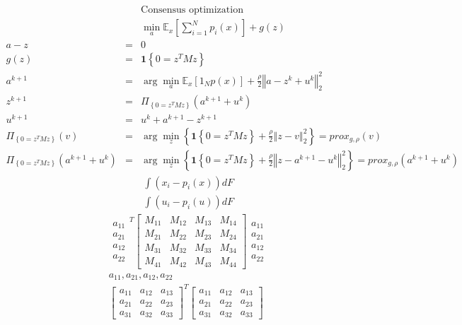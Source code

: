 \documentclass{article}
\begin{document}
\begin{eqnarray*}
&&\text{Consensus optimization} \\
&&\min_{a}\mathbb{E}_{x}\left[ \sum_{i=1}^{N}p_{i}\left( x\right) \right]
+g\left( z\right)  \\
a-z &=&0 \\
g\left( z\right)  &=&\mathbf{1}\left\{ 0=z^{T}Mz\right\}  \\
a^{k+1} &=&\arg \min_{a}\mathbb{E}_{x}\left[ 1_{N}p\left( x\right) \right] +%
\frac{\rho }{2}\left\Vert a-z^{k}+u^{k}\right\Vert _{2}^{2} \\
z^{k+1} &=&\Pi _{\left\{ 0=z^{T}Mz\right\} }\left( a^{k+1}+u^{k}\right)  \\
u^{k+1} &=&u^{k}+a^{k+1}-z^{k+1} \\
\Pi _{\left\{ 0=z^{T}Mz\right\} }\left( v\right)  &=&\arg \min_{z}\left\{ 
\mathbf{1}\left\{ 0=z^{T}Mz\right\} +\frac{\rho }{2}\left\Vert
z-v\right\Vert _{2}^{2}\right\} =prox_{g,\rho }\left( v\right)  \\
\Pi _{\left\{ 0=z^{T}Mz\right\} }\left( a^{k+1}+u^{k}\right)  &=&\arg
\min_{z}\left\{ \mathbf{1}\left\{ 0=z^{T}Mz\right\} +\frac{\rho }{2}%
\left\Vert z-a^{k+1}-u^{k}\right\Vert _{2}^{2}\right\} =prox_{g,\rho }\left(
a^{k+1}+u^{k}\right) 
\end{eqnarray*}%
\begin{eqnarray*}
&&\int \left( x_{i}-p_{i}\left( x\right) \right) dF \\
&&\int \left( u_{i}-p_{i}\left( u\right) \right) dF
\end{eqnarray*}%
\begin{eqnarray*}
&&%
\begin{array}{c}
a_{11} \\ 
a_{21} \\ 
a_{12} \\ 
a_{22}%
\end{array}%
^{T}\left[ 
\begin{array}{cccc}
M_{11} & M_{12} & M_{13} & M_{14} \\ 
M_{21} & M_{22} & M_{23} & M_{24} \\ 
M_{31} & M_{32} & M_{33} & M_{34} \\ 
M_{41} & M_{42} & M_{43} & M_{44}%
\end{array}%
\right] 
\begin{array}{c}
a_{11} \\ 
a_{21} \\ 
a_{12} \\ 
a_{22}%
\end{array}
\\
&&a_{11},a_{21},a_{12},a_{22} \\
&&\left[ 
\begin{array}{ccc}
a_{11} & a_{12} & a_{13} \\ 
a_{21} & a_{22} & a_{23} \\ 
a_{31} & a_{32} & a_{33}%
\end{array}%
\right] ^{T}\left[ 
\begin{array}{ccc}
a_{11} & a_{12} & a_{13} \\ 
a_{21} & a_{22} & a_{23} \\ 
a_{31} & a_{32} & a_{33}%
\end{array}%
\right] 
\end{eqnarray*}%
\end{document}
